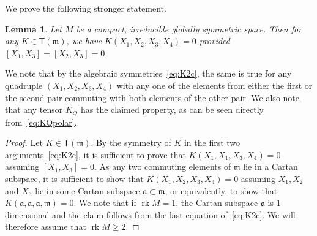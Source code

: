 \documentclass[10pt,a4paper]{amsart}
\newcommand \rk{\operatorname{rk}}
\newcommand \sT{\mathsf{T}}
\newcommand\ag{\mathfrak a}
\newcommand\m{\mathfrak m}
\newcommand \<{\langle}
\renewcommand \>{\rangle}
\newtheorem{lemma}{Lemma}
\begin{document}
We prove the following stronger statement.

	\begin{lemma} \label{l:threecommute}
		Let $M$ be a compact, irreducible globally symmetric space. Then for any $K \in \sT(\m)$, we have $K(X_1,X_2,X_3,X_4) = 0$ provided $[X_1,X_3]=[X_2,X_3] =0$.
	\end{lemma}
	We note that by the algebraic symmetries~\eqref{eq:K2c}, the same is true for any quadruple $(X_1,X_2,X_3,X_4)$ with any one of the elements from either the first or the second pair commuting with both elements of the other pair. We also note that any tensor $K_Q$ has the claimed property, as can be seen directly from~\eqref{eq:KQpolar}.

	\begin{proof}
		Let $K \in \sT(\m)$. By the symmetry of $K$ in the first two arguments~\eqref{eq:K2c}, it is sufficient to prove that $K(X_1,X_1,X_3,X_4) = 0$ assuming $[X_1,X_3]=0$. As any two commuting elements of $\m$ lie in a Cartan subspace, it is sufficient to show that $K(X_1,X_2,X_3,X_4) = 0$ assuming $X_1,X_2$ and $X_3$ lie in some Cartan subspace $\ag \subset \m$, or equivalently, to show that $K(\ag,\ag,\ag,\m) = 0$. We note that if $\rk M =1$, the Cartan subspace $\ag$ is $1$-dimensional and the claim follows from the last equation of~\eqref{eq:K2c}. We will therefore assume that $\rk M \ge 2$. %
		

\end{proof}
\end{document}
